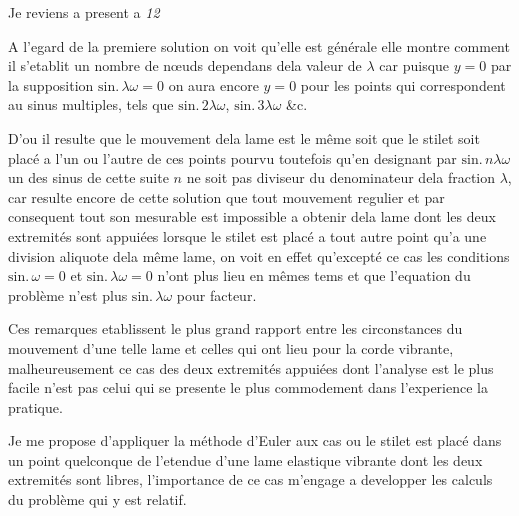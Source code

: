 \documentclass[11pt,a4paper]{article}
\begin{document}
Je reviens a present a \emph{12}

A l'egard de la premiere solution  on voit qu'elle est générale
elle montre comment il s'etablit un nombre de nœuds dependans dela valeur de
$\lambda$ car puisque  $y=0$ par la supposition
$\text{sin.}\,\lambda\omega=0$ on aura encore $y=0$ pour les points qui
correspondent au sinus  multiples, tels que
$\text{sin.}\,2\lambda\omega$, $\text{sin.}\,3\lambda\omega$ \&c.

D'ou il resulte que le mouvement dela lame est le même soit que le stilet soit
placé a l'un ou l'autre de ces points pourvu toutefois qu'en designant par
$\text{sin.}\,n\lambda\omega$ un des sinus de cette suite $n$ ne soit pas
diviseur du denominateur dela fraction $\lambda$, car  resulte
encore de cette solution que tout mouvement regulier et par consequent tout
son mesurable est impossible a obtenir dela lame dont les deux extremités sont
appuiées lorsque le stilet est placé a tout autre point qu'a une division
aliquote dela même lame, on voit en effet qu'excepté ce cas les conditions
$\text{sin.}\,\omega=0$ et $\text{sin.}\,\lambda\omega=0$ n'ont plus lieu en
mêmes tems et que l'equation du problème n'est plus
$\text{sin.}\,\lambda\omega$ pour facteur.

Ces remarques etablissent le plus grand rapport entre les circonstances du
mouvement d'une telle lame et celles qui ont lieu pour la corde vibrante,
malheureusement ce cas des deux extremités appuiées dont l'analyse est le plus
facile n'est pas celui qui se presente le plus commodement dans l'experience
\uncertain{\&} la pratique.

Je me propose d'appliquer  la méthode d'Euler aux cas ou le
stilet est placé dans un point quelconque de l'etendue d'une lame elastique
vibrante dont les deux extremités sont libres, l'importance de ce cas m'engage
a developper  les calculs du problème qui y est relatif.
\end{document}
